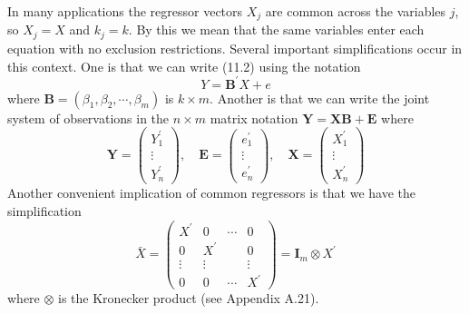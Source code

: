 \documentclass[10pt]{article}
\begin{document}
In many applications the regressor vectors $X_{j}$ are common across the variables $j$, so $X_{j}=X$ and $k_{j}=k$. By this we mean that the same variables enter each equation with no exclusion restrictions. Several important simplifications occur in this context. One is that we can write (11.2) using the notation
$$
Y=\boldsymbol{B}^{\prime} X+e
$$
where $\boldsymbol{B}=\left(\beta_{1}, \beta_{2}, \cdots, \beta_{m}\right)$ is $k \times m$. Another is that we can write the joint system of observations in the $n \times m$ matrix notation $\boldsymbol{Y}=\boldsymbol{X} \boldsymbol{B}+\boldsymbol{E}$ where
$$
\boldsymbol{Y}=\left(\begin{array}{c}
Y_{1}^{\prime} \\
\vdots \\
Y_{n}^{\prime}
\end{array}\right), \quad \boldsymbol{E}=\left(\begin{array}{c}
e_{1}^{\prime} \\
\vdots \\
e_{n}^{\prime}
\end{array}\right), \quad \boldsymbol{X}=\left(\begin{array}{c}
X_{1}^{\prime} \\
\vdots \\
X_{n}^{\prime}
\end{array}\right)
$$
Another convenient implication of common regressors is that we have the simplification
$$
\bar{X}=\left(\begin{array}{cccc}
X^{\prime} & 0 & \cdots & 0 \\
0 & X^{\prime} & & 0 \\
\vdots & \vdots & & \vdots \\
0 & 0 & \cdots & X^{\prime}
\end{array}\right)=\boldsymbol{I}_{m} \otimes X^{\prime}
$$
where $\otimes$ is the Kronecker product (see Appendix A.21).
\end{document}
